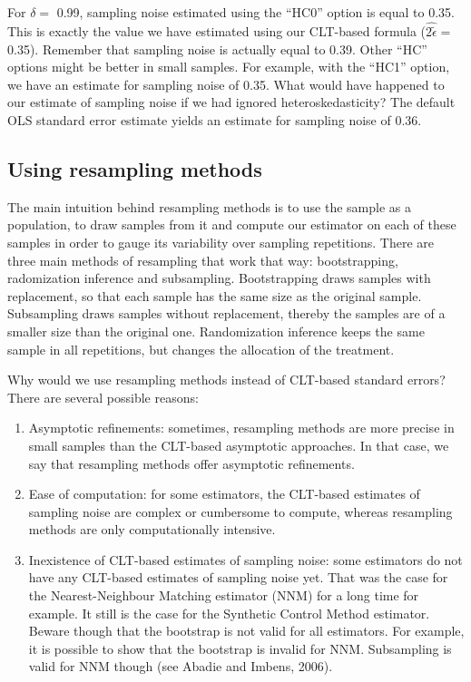 \documentclass[]{book}
\providecommand{\tightlist}{%
  \setlength{\itemsep}{0pt}\setlength{\parskip}{0pt}}
\theoremstyle{definition}
\theoremstyle{definition}
\theoremstyle{definition}
\theoremstyle{remark}
\begin{document}
For \(\delta=\) 0.99, sampling noise estimated using the ``HC0'' option is equal to 0.35.
This is exactly the value we have estimated using our CLT-based formula (\(\hat{2\tilde{\epsilon}}=\) 0.35).
Remember that sampling noise is actually equal to 0.39.
Other ``HC'' options might be better in small samples.
For example, with the ``HC1'' option, we have an estimate for sampling noise of 0.35.
What would have happened to our estimate of sampling noise if we had ignored heteroskedasticity?
The default OLS standard error estimate yields an estimate for sampling noise of 0.36.

\hypertarget{sec:resamp}{%
\subsection{Using resampling methods}\label{sec:resamp}}

The main intuition behind resampling methods is to use the sample as a population, to draw samples from it and compute our estimator on each of these samples in order to gauge its variability over sampling repetitions.
There are three main methods of resampling that work that way: bootstrapping, radomization inference and subsampling.
Bootstrapping draws samples with replacement, so that each sample has the same size as the original sample.
Subsampling draws samples without replacement, thereby the samples are of a smaller size than the original one.
Randomization inference keeps the same sample in all repetitions, but changes the allocation of the treatment.

Why would we use resampling methods instead of CLT-based standard errors?
There are several possible reasons:

\begin{enumerate}
\def\labelenumi{\arabic{enumi}.}
\tightlist
\item
  Asymptotic refinements: sometimes, resampling methods are more precise in small samples than the CLT-based asymptotic approaches.
  In that case, we say that resampling methods offer asymptotic refinements.
\item
  Ease of computation: for some estimators, the CLT-based estimates of sampling noise are complex or cumbersome to compute, whereas resampling methods are only computationally intensive.
\item
  Inexistence of CLT-based estimates of sampling noise: some estimators do not have any CLT-based estimates of sampling noise yet.
  That was the case for the Nearest-Neighbour Matching estimator (NNM) for a long time for example.
  It still is the case for the Synthetic Control Method estimator.
  Beware though that the bootstrap is not valid for all estimators.
  For example, it is possible to show that the bootstrap is invalid for NNM.
  Subsampling is valid for NNM though (see Abadie and Imbens, 2006).
\end{enumerate}
\end{document}
